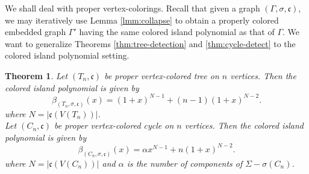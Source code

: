 \documentclass[10pt, reqno]{amsart}
\newcommand{\hf}{\hspace*{0.5cm}}
\theoremstyle{plain}
\newtheorem{theorem}{Theorem}[section]
\theoremstyle{remark}
\theoremstyle{definition}
\numberwithin{equation}{section}
\begin{document}
\hf We shall deal with proper vertex-colorings. Recall that given a graph $(\Gamma,\sigma,\mathfrak{c})$, we may iteratively use Lemma \ref{lmm:collapse} to obtain a properly colored embedded graph $\Gamma'$ having the same colored island polynomial as that of $\Gamma$. We want to generalize Theorems \ref{thm:tree-detection} and \ref{thm:cycle-detect} to the colored island polynomial setting.
\begin{theorem}\label{thm:tree-cycle-color-detect}
Let $(T_n,\mathfrak{c})$ be proper vertex-colored tree on $n$ vertices. Then the colored island polynomial is given by
\begin{equation}\label{eqn:tree-color}
{\beta}_{(T_{n},\sigma,\mathfrak{c})}(x)= (1+x)^{N-1}+(n-1)(1+x)^{N-2}.
\end{equation}
where $N=|\mathfrak{c}(V(T_n))|$.\\
\hf Let $(C_n,\mathfrak{c})$ be proper vertex-colored cycle on $n$ vertices. Then the colored island polynomial is given by
\begin{equation}\label{eqn:cycle-color}
{\beta}_{(C_{n},\sigma,\mathfrak{c})}(x)=\alpha x^{N-1}+n(1+x)^{N-2}.
\end{equation}
where $N=|\mathfrak{c}(V(C_n))|$ and $\alpha$ is the number of components of $\Sigma-\sigma(C_n)$.
\end{theorem}
\end{document}
